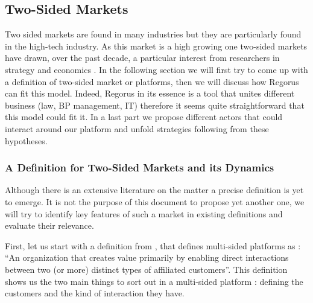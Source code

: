\documentclass[10pt]{report}
\begin{document}
\subsection{Two-Sided Markets}

Two sided markets are found in many industries but they are particularly found in the high-tech industry. As this market is a high growing one two-sided markets have drawn, over the past decade, a particular interest from researchers in strategy and economics \autocite{Hagiu2011}. In the following section we will first try to come up with a definition of two-sided market or platforms, then we will discuss how Regorus can fit this model. Indeed, Regorus in its essence is a tool that unites different business (law, BP management, IT) therefore it seems quite straightforward that this model could fit it. In a last part we propose different actors that could interact around our platform and unfold strategies following from these hypotheses.

\subsubsection{A Definition for Two-Sided Markets and its Dynamics}

Although there is an extensive literature on the matter a precise definition is yet to emerge. It is not the purpose of this document to propose yet another one, we will try to identify key features of such a market in existing definitions and evaluate their relevance.

First, let us start with a definition from \autocite{Hagiu2011}, that defines multi-sided platforms as : \enquote{An organization that creates value primarily by enabling direct interactions between two (or more) distinct types of affiliated customers}. This definition shows us the two main things to sort out in a multi-sided platform : defining the customers and the kind of interaction they have. 
\end{document}
